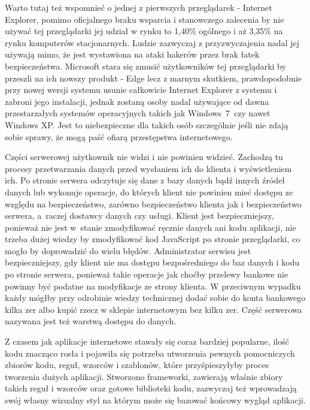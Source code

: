 \documentclass[12pt,a4paper,oneside]{book}
\begin{document}
Warto tutaj też wspomnieć o jednej z pierwszych przeglądarek - Internet Explorer, pomimo oficjalnego braku wsparcia i stanowczego zalecenia by nie używać tej przeglądarki jej udział w rynku to 1,40\% ogólnego i aż 3,35\% na rynku komputerów stacjonarnych. Ludzie zazwyczaj z przyzwyczajenia nadal jej używają mimo, że jest wystawiona na ataki hakerów przez brak łatek bezpieczeństwa. Microsoft stara się zmusić użytkowników tej przeglądarki by przeszli na ich nowszy produkt - Edge lecz z marnym skutkiem, prawdopodobnie przy nowej wersji systemu usunie całkowicie Internet Explorer z systemu i zabroni jego instalacji, jednak zostaną osoby nadal używające od dawna przestarzałych systemów operacyjnych takich jak Windows~7~czy nawet Windows XP. Jest to niebezpieczne dla takich osób szczególnie jeśli nie zdają sobie sprawy, że mogą paść ofiarą przestępstwa internetowego.

Części serwerowej użytkownik nie widzi i nie powinien widzieć. Zachodzą tu procesy przetwarzania danych przed wysłaniem ich do klienta i wyświetleniem ich. Po stronie serwera odczytuje się dane z bazy danych bądź innych źródeł danych lub wykonuje operacje, do których klient nie powinien mieć dostępu ze względu na bezpieczeństwo, zarówno bezpieczeństwo klienta jak i bezpieczeństwo serwera, a~raczej dostawcy danych czy usługi. Klient jest bezpieczniejszy, ponieważ nie jest w~stanie zmodyfikować ręcznie danych ani kodu aplikacji, nie trzeba dużej wiedzy by zmodyfikować kod JavaScript po stronie przeglądarki, co mogło by doprowadzić do wielu błędów. Administrator serwisu jest bezpieczniejszy, gdy klient nie ma dostępu bezpośredniego do baz danych i kodu po stronie serwera, ponieważ takie operacje jak choćby przelewy bankowe nie powinny być podatne na modyfikacje ze strony klienta. W przeciwnym wypadku każdy mógłby przy odrobinie wiedzy technicznej dodać sobie do konta bankowego kilka zer albo kupić rzecz w sklepie internetowym bez kilku zer. Część serwerowa nazywana jest też warstwą dostępu do danych.

Z czasem jak aplikacje internetowe stawały się coraz bardziej popularne, ilość kodu znacząco rosła i pojawiła się potrzeba utworzenia pewnych pomocniczych zbiorów kodu, reguł, wzorców i szablonów, które przyśpieszyłyby proces tworzenia dużych aplikacji. Stworzono frameworki, zawierają właśnie zbiory takich reguł i wzorców oraz gotowe biblioteki kodu, zazwyczaj też wprowadzają swój własny wizualny styl na którym może się bazować końcowy wygląd aplikacji. 
\end{document}
